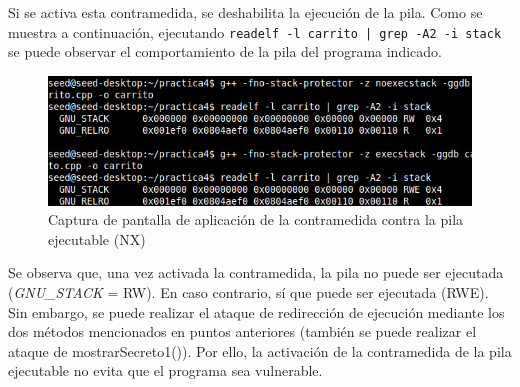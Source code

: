 \documentclass[10pt,a4paper]{article}
\begin{document}
Si se activa esta contramedida, se deshabilita la ejecución de la pila. Como se muestra a continuación, ejecutando \texttt{readelf -l carrito | grep -A2 -i stack} se puede observar el comportamiento de la pila del programa indicado.

\begin{figure}[h!]
	\centering
	\includegraphics[scale=0.6]{images/contramedida_3.png}
	\caption{Captura de pantalla de aplicación de la contramedida contra la pila ejecutable (NX)}
	\label{fig:contramedida3}
\end{figure}

Se observa que, una vez activada la contramedida, la pila no puede ser ejecutada (\textit{GNU\_STACK} = RW). En caso contrario, sí que puede ser ejecutada (RWE).
Sin embargo, se puede realizar el ataque de redirección de ejecución mediante los dos métodos mencionados en puntos anteriores (también se puede realizar el ataque de mostrarSecreto1()). Por ello, la activación de la contramedida de la pila ejecutable no evita que el programa sea vulnerable.
\end{document}
